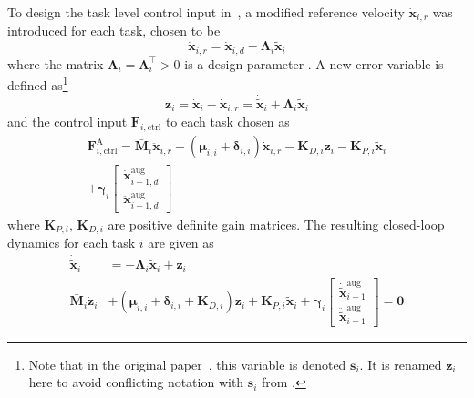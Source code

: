 \documentclass[../main.tex]{subfiles}
\begin{document}
To design the task level control input in~\cite{Saeboe2022}, a modified reference velocity $\dot{\bm{x}}_{i,r}$ was introduced for each task, chosen to be
\begin{equation}\label{eq:tasks:xir}
    \dot{\bm{x}}_{i,r} = \dot{\bm{x}}_{i,d} - \bm{\Lambda}_i \tilde{\bm{x}}_i
\end{equation}
where the matrix $\bm{\Lambda}_i = \bm{\Lambda}_i^\top > 0$ is a design parameter . A new error variable is defined as\footnote{Note that in the original paper~\cite{Saeboe2022}, this variable is denoted $\bm{s}_i$. It is renamed $\bm{z}_i$ here to avoid conflicting notation with $\bm{s}_i$ from \cite{Garofalo2020}.}
\begin{equation}\label{eq:tasks:zi}
    \bm{z}_i = \dot{\bm{x}}_i - \dot{\bm{x}}_{i,r}  = \dot{\tilde{\bm{x}}}_i + \bm{\Lambda}_i \tilde{\bm{x}}_i
\end{equation}
and the control input $\bm{F}_{i,\textrm{ctrl}}$ to each task chosen as
\begin{multline}\label{eq:tasks:Fictrl}
        \bm{F}^{\textrm{A}}_{i,\textrm{ctrl}} = \bar{\bm{M}}_i \ddot{\bm{x}}_{i,r} + \left( \bm{\mu}_{i,i} + \bm{\delta}_{i,i} \right) \dot{\bm{x}}_{i,r} - \bm{K}_{D,i} \bm{z}_i - \bm{K}_{P,i} \tilde{\bm{x}}_i 
        \\
        + \bm{\gamma}_i \begin{bmatrix} \dot{\bm{x}}^{\textrm{aug}}_{i-1,d} \\ \ddot{\bm{x}}^{\textrm{aug}}_{i-1,d}
        \end{bmatrix}
\end{multline}
where $\bm{K}_{P,i},\, \bm{K}_{D,i}$ are positive definite gain matrices. The resulting closed-loop dynamics for each task $i$ are given as
\begin{subequations}\label{eq:tasks:CL_task_i}
    \begin{align}
        \dot{\tilde{\bm{x}}}_i &= -\bm{\Lambda}_i \tilde{\bm{x}}_i + \bm{z}_i \label{eq:tasks:CL_xitildedot}\\
        \bar{\bm{M}}_i \dot{\bm{z}}_i &+ \left( \bm{\mu}_{i,i} + \bm{\delta}_{i,i} + \bm{K}_{D,i} \right) \bm{z}_i + \bm{K}_{P,i} \tilde{\bm{x}}_i + \bm{\gamma}_i \begin{bmatrix} \dot{\tilde{\bm{x}}}^{\textrm{aug}}_{i-1} \\ \ddot{\tilde{\bm{x}}}^{\textrm{aug}}_{i-1}
        \end{bmatrix}  = \bm{0} \label{eq:tasks:CL_zidot}
    \end{align}
\end{subequations}
\end{document}
